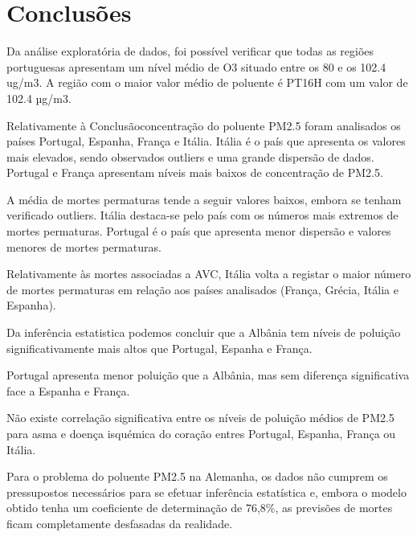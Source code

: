 \documentclass[conference]{IEEEtran}
\begin{document}
\section*{Conclusões}

Da análise exploratória de dados, foi possível verificar que todas as regiões portuguesas apresentam um nível médio de O3 situado entre os 80 e os 102.4 ug/m3. A região com o maior valor médio de poluente é PT16H com um valor de 102.4 µg/m3.

Relativamente à Conclusãoconcentração do poluente PM2.5 foram analisados os países Portugal, Espanha, França e Itália. Itália é o país que apresenta os valores mais elevados, sendo observados outliers e uma grande dispersão de dados. Portugal e França apresentam níveis mais baixos de concentração de PM2.5.

A média de mortes permaturas tende a seguir valores baixos, embora se tenham verificado outliers. Itália destaca-se pelo país com os números mais extremos de mortes permaturas. Portugal é o país que apresenta menor dispersão e valores menores de mortes permaturas.

Relativamente às mortes associadas a AVC, Itália volta a registar o maior número de mortes permaturas em relação aos países analisados (França, Grécia, Itália e Espanha).

Da inferência estatistica podemos concluir que a Albânia tem níveis de poluição significativamente mais altos que Portugal, Espanha e França.

Portugal apresenta menor poluição que a Albânia, mas sem diferença significativa face a Espanha e França.

Não existe correlação significativa entre os níveis de poluição médios de PM2.5 para asma e doença isquémica do coração entres Portugal, Espanha, França ou Itália.

Para o problema do poluente PM2.5 na Alemanha, os dados não cumprem os pressupostos necessários para se efetuar inferência estatística e, embora o modelo obtido tenha um coeficiente de determinação de 76,8\%, as previsões de mortes ficam completamente desfasadas da realidade.
\end{document}
